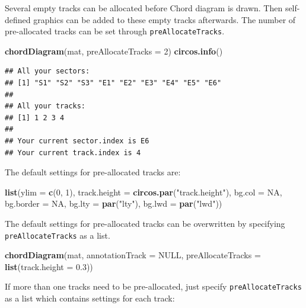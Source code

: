 \documentclass[]{book}
\newenvironment{Shaded}{\begin{snugshade}}{\end{snugshade}}
\newcommand{\KeywordTok}[1]{\textcolor[rgb]{0.13,0.29,0.53}{\textbf{#1}}}
\newcommand{\DataTypeTok}[1]{\textcolor[rgb]{0.13,0.29,0.53}{#1}}
\newcommand{\DecValTok}[1]{\textcolor[rgb]{0.00,0.00,0.81}{#1}}
\newcommand{\FloatTok}[1]{\textcolor[rgb]{0.00,0.00,0.81}{#1}}
\newcommand{\StringTok}[1]{\textcolor[rgb]{0.31,0.60,0.02}{#1}}
\newcommand{\OtherTok}[1]{\textcolor[rgb]{0.56,0.35,0.01}{#1}}
\newcommand{\NormalTok}[1]{#1}
\begin{document}
Several empty tracks can be allocated before Chord diagram is drawn.
Then self-defined graphics can be added to these empty tracks
afterwards. The number of pre-allocated tracks can be set through
\texttt{preAllocateTracks}.

\begin{Shaded}
\begin{Highlighting}[]
\KeywordTok{chordDiagram}\NormalTok{(mat, }\DataTypeTok{preAllocateTracks =} \DecValTok{2}\NormalTok{)}
\KeywordTok{circos.info}\NormalTok{()}
\end{Highlighting}
\end{Shaded}

\begin{verbatim}
## All your sectors:
## [1] "S1" "S2" "S3" "E1" "E2" "E3" "E4" "E5" "E6"
## 
## All your tracks:
## [1] 1 2 3 4
## 
## Your current sector.index is E6
## Your current track.index is 4
\end{verbatim}

The default settings for pre-allocated tracks are:

\begin{Shaded}
\begin{Highlighting}[]
\KeywordTok{list}\NormalTok{(}\DataTypeTok{ylim =} \KeywordTok{c}\NormalTok{(}\DecValTok{0}\NormalTok{, }\DecValTok{1}\NormalTok{),}
     \DataTypeTok{track.height =} \KeywordTok{circos.par}\NormalTok{(}\StringTok{"track.height"}\NormalTok{),}
     \DataTypeTok{bg.col =} \OtherTok{NA}\NormalTok{,}
     \DataTypeTok{bg.border =} \OtherTok{NA}\NormalTok{,}
     \DataTypeTok{bg.lty =} \KeywordTok{par}\NormalTok{(}\StringTok{"lty"}\NormalTok{),}
     \DataTypeTok{bg.lwd =} \KeywordTok{par}\NormalTok{(}\StringTok{"lwd"}\NormalTok{))}
\end{Highlighting}
\end{Shaded}

The default settings for pre-allocated tracks can be overwritten by
specifying \texttt{preAllocateTracks} as a list.

\begin{Shaded}
\begin{Highlighting}[]
\KeywordTok{chordDiagram}\NormalTok{(mat, }\DataTypeTok{annotationTrack =} \OtherTok{NULL}\NormalTok{,}
    \DataTypeTok{preAllocateTracks =} \KeywordTok{list}\NormalTok{(}\DataTypeTok{track.height =} \FloatTok{0.3}\NormalTok{))}
\end{Highlighting}
\end{Shaded}

If more than one tracks need to be pre-allocated, just specify
\texttt{preAllocateTracks} as a list which contains settings for each
track:
\end{document}
